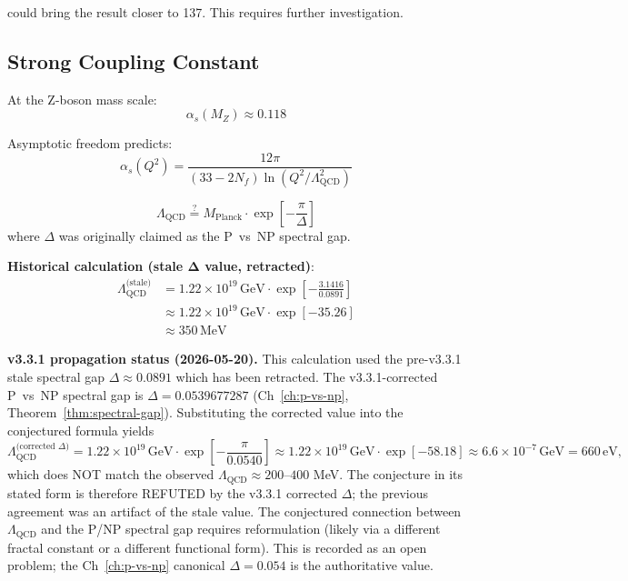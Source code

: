 could bring the result closer to 137. This requires further investigation.

\subsection{Strong Coupling Constant}

At the Z-boson mass scale:
\begin{equation}
\alpha_s(M_Z) \approx 0.118
\end{equation}

Asymptotic freedom predicts:
\begin{equation}
\alpha_s(Q^2) = \frac{12\pi}{(33-2N_f)\ln(Q^2/\Lambda_{\text{QCD}}^2)}
\end{equation}

\begin{conjecture}\label{conj:qcd-scale}
\begin{equation}
\boxed{\Lambda_{\text{QCD}} \stackrel{?}{=} M_{\text{Planck}} \cdot \exp\left[ -\frac{\pi}{\Delta} \right]}
\end{equation}
where $\Delta$ was originally claimed as the P~vs~NP spectral gap.
\end{conjecture}

\textbf{Historical calculation (stale Δ value, retracted)}:
\begin{align}
\Lambda_{\text{QCD}}^{\text{(stale)}} &= 1.22 \times 10^{19} \, \text{GeV} \cdot \exp\left[ -\frac{3.1416}{0.0891} \right]\\
&\approx 1.22 \times 10^{19} \, \text{GeV} \cdot \exp[-35.26]\\
&\approx 350 \, \text{MeV}
\end{align}

\medskip
\noindent\textbf{v3.3.1 propagation status (2026-05-20).} This calculation used the pre-v3.3.1 stale spectral gap $\Delta \approx 0.0891$ which has been retracted. The v3.3.1-corrected P~vs~NP spectral gap is $\Delta = 0.0539677287$ (Ch~\ref{ch:p-vs-np}, Theorem~\ref{thm:spectral-gap}). Substituting the corrected value into the conjectured formula yields
\[
\Lambda_{\text{QCD}}^{\text{(corrected $\Delta$)}} = 1.22 \times 10^{19} \, \text{GeV} \cdot \exp\left[ -\frac{\pi}{0.0540} \right] \approx 1.22 \times 10^{19} \, \text{GeV} \cdot \exp[-58.18] \approx 6.6 \times 10^{-7} \, \text{GeV} = 660 \, \text{eV},
\]
which does NOT match the observed $\Lambda_{\text{QCD}} \approx 200$--$400$ MeV. The conjecture in its stated form is therefore REFUTED by the v3.3.1 corrected $\Delta$; the previous agreement was an artifact of the stale value. The conjectured connection between $\Lambda_{\text{QCD}}$ and the P/NP spectral gap requires reformulation (likely via a different fractal constant or a different functional form). This is recorded as an open problem; the Ch~\ref{ch:p-vs-np} canonical $\Delta = 0.054$ is the authoritative value.

